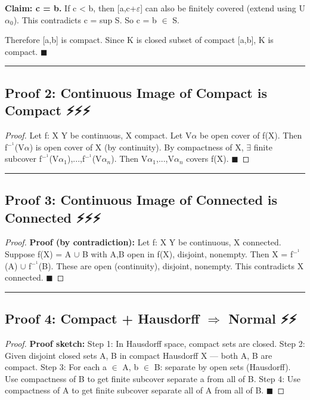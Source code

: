 \documentclass[12pt,a4paper,openany]{book}
\begin{document}
{{\textbf{Claim: c = b.} If c < b, then [a,c+$\varepsilon$] can also be finitely covered (extend using U$\alpha_0$). This contradicts c = sup S. So c = b $\in$ S. 

Therefore [a,b] is compact. Since K is closed subset of compact [a,b], K is compact. $\blacksquare$

\bigskip\noindent\rule{\textwidth}{0.4pt}\bigskip

\subsection{Proof 2: Continuous Image of Compact is Compact ⚡⚡⚡}

\begin{proof}

Let f: X  Y be continuous, X compact. Let {V$\alpha$} be open cover of f(X).
Then {f$^{-}^1$(V$\alpha$)} is open cover of X (by continuity). By compactness of X, $\exists$ finite subcover f$^{-}^1$(V$\alpha_1$),...,f$^{-}^1$(V$\alpha_n$). Then V$\alpha_1$,...,V$\alpha_n$ covers f(X). $\blacksquare$
\end{proof}

\bigskip\noindent\rule{\textwidth}{0.4pt}\bigskip

\subsection{Proof 3: Continuous Image of Connected is Connected ⚡⚡⚡}

\begin{proof}
\textbf{Proof (by contradiction):}
Let f: X  Y be continuous, X connected. Suppose f(X) = A $\cup$ B with A,B open in f(X), disjoint, nonempty.
Then X = f$^{-}^1$(A) $\cup$ f$^{-}^1$(B). These are open (continuity), disjoint, nonempty. This contradicts X connected. $\blacksquare$
\end{proof}

\bigskip\noindent\rule{\textwidth}{0.4pt}\bigskip

\subsection{Proof 4: Compact + Hausdorff $\Longrightarrow$ Normal ⚡⚡}

\begin{proof}
\textbf{Proof sketch:}
Step 1: In Hausdorff space, compact sets are closed.
Step 2: Given disjoint closed sets A, B in compact Hausdorff X — both A, B are compact.
Step 3: For each a $\in$ A, b $\in$ B: separate by open sets (Hausdorff). Use compactness of B to get finite subcover  separate a from all of B.
Step 4: Use compactness of A to get finite subcover  separate all of A from all of B. $\blacksquare$
\end{proof}

}}
\end{document}
